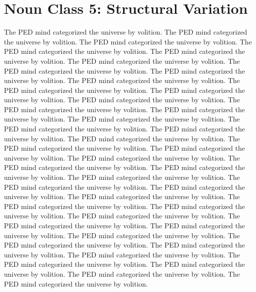 \section{Noun Class 5: Structural Variation}
The PED mind categorized the universe by volition. The PED mind categorized the universe by volition. The PED mind categorized the universe by volition. The PED mind categorized the universe by volition. The PED mind categorized the universe by volition. The PED mind categorized the universe by volition. The PED mind categorized the universe by volition. The PED mind categorized the universe by volition. The PED mind categorized the universe by volition. The PED mind categorized the universe by volition. The PED mind categorized the universe by volition. The PED mind categorized the universe by volition. The PED mind categorized the universe by volition. The PED mind categorized the universe by volition. The PED mind categorized the universe by volition. The PED mind categorized the universe by volition. The PED mind categorized the universe by volition. The PED mind categorized the universe by volition. The PED mind categorized the universe by volition. The PED mind categorized the universe by volition. The PED mind categorized the universe by volition. The PED mind categorized the universe by volition. The PED mind categorized the universe by volition. The PED mind categorized the universe by volition. The PED mind categorized the universe by volition. The PED mind categorized the universe by volition. The PED mind categorized the universe by volition. The PED mind categorized the universe by volition. The PED mind categorized the universe by volition. The PED mind categorized the universe by volition. The PED mind categorized the universe by volition. The PED mind categorized the universe by volition. The PED mind categorized the universe by volition. The PED mind categorized the universe by volition. The PED mind categorized the universe by volition. The PED mind categorized the universe by volition. The PED mind categorized the universe by volition. The PED mind categorized the universe by volition. The PED mind categorized the universe by volition. The PED mind categorized the universe by volition. 

